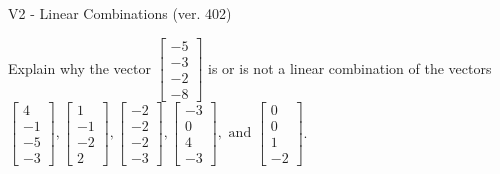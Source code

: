 \begin{exercise}
  \begin{exerciseTitle}V2 - Linear Combinations (ver. 402)\end{exerciseTitle}
  \begin{exerciseStatement}
    Explain why the vector \(\left[\begin{array}{c}
-5 \\
-3 \\
-2 \\
-8
\end{array}\right]\)  is or is not a linear 
	combination of the vectors \(\left[\begin{array}{c}
4 \\
-1 \\
-5 \\
-3
\end{array}\right] , \left[\begin{array}{c}
1 \\
-1 \\
-2 \\
2
\end{array}\right] , \left[\begin{array}{c}
-2 \\
-2 \\
-2 \\
-3
\end{array}\right] , \left[\begin{array}{c}
-3 \\
0 \\
4 \\
-3
\end{array}\right] , \text{ and } \left[\begin{array}{c}
0 \\
0 \\
1 \\
-2
\end{array}\right]\).
	



\end{exerciseStatement}
\end{exercise}
